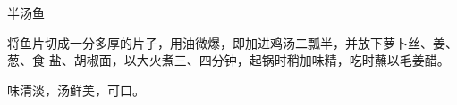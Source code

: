 %
%
%
%
%
%
%
\begin{recipe}{半汤鱼}

\ingredients


\preparation

将鱼片切成一分多厚的片子，用油微爆，即加进鸡汤二瓢半，并放下萝卜丝、姜、葱、食
盐、胡椒面，以大火煮三、四分钟，起锅时稍加味精，吃时蘸以毛姜醋。

\features

味清淡，汤鲜美，可口。

\end{recipe}


